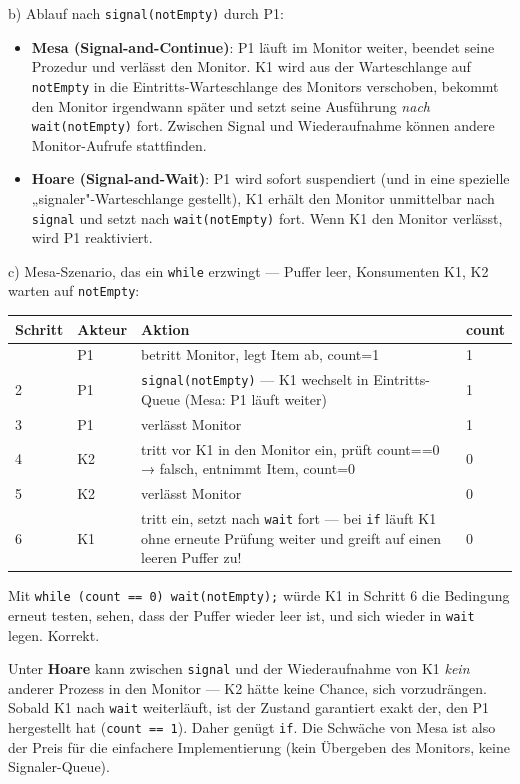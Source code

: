 \documentclass[11pt, a4paper]{article}
\begin{document}
b) Ablauf nach \texttt{signal(notEmpty)} durch P1:


\begin{itemize}
  \item \textbf{Mesa (Signal-and-Continue)}: P1 läuft im Monitor weiter, beendet seine Prozedur und verlässt den Monitor. K1 wird aus der Warteschlange auf \texttt{notEmpty} in die Eintritts-Warteschlange des Monitors verschoben, bekommt den Monitor irgendwann später und setzt seine Ausführung \textit{nach} \texttt{wait(notEmpty)} fort. Zwischen Signal und Wiederaufnahme können andere Monitor-Aufrufe stattfinden.
  \item \textbf{Hoare (Signal-and-Wait)}: P1 wird sofort suspendiert (und in eine spezielle „signaler"-Warteschlange gestellt), K1 erhält den Monitor unmittelbar nach \texttt{signal} und setzt nach \texttt{wait(notEmpty)} fort. Wenn K1 den Monitor verlässt, wird P1 reaktiviert.
\end{itemize}

c) Mesa-Szenario, das ein \texttt{while} erzwingt — Puffer leer, Konsumenten K1, K2 warten auf \texttt{notEmpty}:



{\small
\begin{tabularx}{\linewidth}{XXXX}
\hline
\rowcolor{tableheadbg}
{\color{white}\textbf{Schritt}} & {\color{white}\textbf{Akteur}} & {\color{white}\textbf{Aktion}} & {\color{white}\textbf{count}} \\[2pt]
\hline
\endhead
\hline
\endfoot
1 & P1 & betritt Monitor, legt Item ab, count=1 & 1 \\
2 & P1 & \texttt{signal(notEmpty)} — K1 wechselt in Eintritts-Queue (Mesa: P1 läuft weiter) & 1 \\
3 & P1 & verlässt Monitor & 1 \\
4 & K2 & tritt vor K1 in den Monitor ein, prüft count==0 → falsch, entnimmt Item, count=0 & 0 \\
5 & K2 & verlässt Monitor & 0 \\
6 & K1 & tritt ein, setzt nach \texttt{wait} fort — bei \texttt{if} läuft K1 ohne erneute Prüfung weiter und greift auf einen leeren Puffer zu! & 0 \\
\end{tabularx}
}


Mit \texttt{while (count == 0) wait(notEmpty);} würde K1 in Schritt 6 die Bedingung erneut testen, sehen, dass der Puffer wieder leer ist, und sich wieder in \texttt{wait} legen. Korrekt.


Unter \textbf{Hoare} kann zwischen \texttt{signal} und der Wiederaufnahme von K1 \textit{kein} anderer Prozess in den Monitor — K2 hätte keine Chance, sich vorzudrängen. Sobald K1 nach \texttt{wait} weiterläuft, ist der Zustand garantiert exakt der, den P1 hergestellt hat (\texttt{count == 1}). Daher genügt \texttt{if}. Die Schwäche von Mesa ist also der Preis für die einfachere Implementierung (kein Übergeben des Monitors, keine Signaler-Queue).
\end{document}
